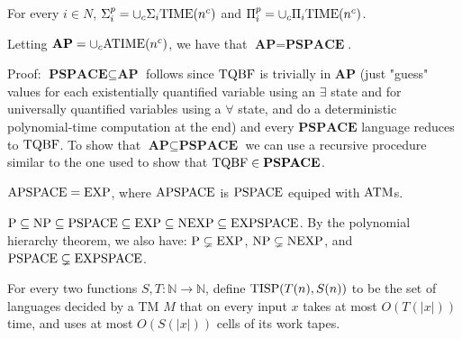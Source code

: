 \begin{note}
For every $i \in N$, $\Sigma_{i}^{p} = \cup_{c}\Sigma_{i}\mathrm{TIME}(n^c)$ and
$\Pi_{i}^{p} = \cup_{c} \Pi_{i} \mathrm{TIME}(n^c)$.
\end{note}

\begin{note}
Letting $\textbf{AP} = \cup_{c} \mathrm{ATIME}(n^c)$, we have
that $\textbf{AP} = \textbf{PSPACE}$.

Proof: $\textbf{PSPACE} \subseteq \textbf{AP}$ follows since $\mathrm{TQBF}$ is
trivially in $\textbf{AP}$ (just "guess" values for each existentially
quantified variable using an $\exists$ state and for universally quantified
variables using a $\forall$ state, and do a deterministic polynomial-time
computation at the end) and every $\textbf{PSPACE}$ language reduces
to $\mathrm{TQBF}$. To show that $\textbf{AP} \subseteq \textbf{PSPACE}$ we can use a
recursive procedure similar to the one used to show
that $\mathrm{TQBF} \in \textbf{PSPACE}$. 
\end{note}

\begin{note}
  $\mathrm{APSPACE} = \mathrm{EXP}$, where $\mathrm{APSPACE}$ is $\mathrm{PSPACE}$ equiped with $\mathrm{ATM}$s.
\end{note}

\begin{note}
  $\mathrm{P} \subseteq \mathrm{NP} \subseteq \mathrm{PSPACE} \subseteq \mathrm{EXP} \subseteq \mathrm{NEXP}
  \subseteq \mathrm{EXPSPACE}$.
  By the polynomial hierarchy theorem, we also have:
  $\mathrm{P} \subsetneq \mathrm{EXP}$, $\mathrm{NP} \subsetneq \mathrm{NEXP}$, and
  $\mathrm{PSPACE} \subsetneq \mathrm{EXPSPACE}$.
\end{note}

\begin{note}
  For every two functions $S, T : \mathbb{N} \to \mathbb{N}$, define
  $\mathrm{TISP}(T(n), S(n))$ to be the set of languages decided by a TM $M$ that on
  every input $x$ takes at most $O(T(|x|))$ time, and uses at most
  $O(S(|x|))$ cells of its work tapes.
\end{note}
















